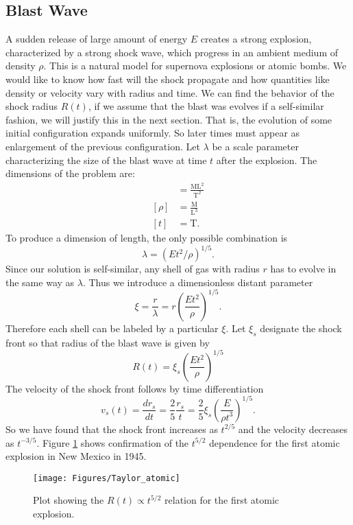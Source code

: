 \documentclass{article}
\begin{document}
\subsection{Blast Wave}
A sudden release of large amount of energy $E$ creates a strong explosion, characterized by a strong shock wave, which progress in an ambient medium of density $\rho$. This is a natural model for supernova explosions or atomic bombs. We would like to know how fast will the shock propagate and how quantities like density or velocity vary with radius and time. We can find the behavior of the shock radius $R(t)$, if we assume that the blast was evolves if a self-similar fashion, we will justify this in the next section. That is, the evolution of some initial configuration expands uniformly. So later times must appear as enlargement of the previous configuration. Let $\lambda$ be a scale parameter characterizing the size of the blast wave at time $t$ after the explosion. The dimensions of the problem are:
\begin{align*}
[E] &= \mathrm{\frac{ML^2}{T^2}}\\
[\rho] &= \mathrm{\frac{M}{L^3}}\\
[t] &= \mathrm{T}.
\end{align*}
To produce a dimension of length, the only possible combination is
\begin{equation}
\lambda = \left(Et^2/\rho\right)^{1/5}.
\end{equation}
Since our solution is self-similar, any shell of gas with radius $r$ has to evolve in the same way  as $\lambda$. Thus we introduce a dimensionless distant parameter
\begin{equation}
\xi = \frac{r}{\lambda}=r\left(\frac{Et^2}{\rho}\right)^{1/5}.
\end{equation}
Therefore each shell can be labeled by a particular $\xi$. Let $\xi_s$ designate the shock front so that radius of the blast wave is given by
\begin{equation*}
\label{eq: shock radius}
R(t) = \xi_s \left(\frac{Et^2}{\rho}\right)^{1/5}
\end{equation*}
The velocity of the shock front follows by time differentiation
\begin{equation*}
v_s(t) = \frac{dr_s}{dt} = \frac{2}{5}\frac{r_s}{t} = \frac{2}{5} \xi_s \left(\frac{E}{\rho t^3}\right)^{1/5}.
\end{equation*}
So we have found that the shock front increases as $t^{2/5}$ and the velocity decreases as $t^{-3/5}$. Figure \ref{fig: Atomic Bomb} shows confirmation of the $t^{5/2}$ dependence for the first atomic explosion in New Mexico in 1945.
\begin{figure}[h!]
\begin{center}
\texttt{[image: Figures/Taylor\_atomic]}
\end{center}
\caption{Plot showing the $R(t) \propto t^{5/2}$ relation for the first atomic explosion.}
\label{fig: Atomic Bomb}
\end{figure}
\end{document}

